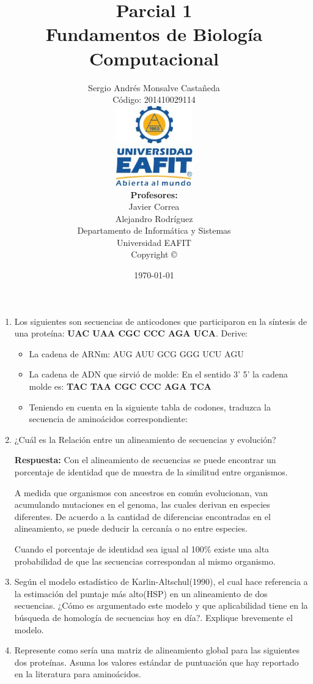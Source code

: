 \documentclass[twoside,letterpaper,12pt]{report}
\title{Parcial 1\\[1cm]
Fundamentos de Biología Computacional}
\author{
	Sergio Andrés Monsalve Castañeda \\
	Código: 201410029114\\[0.5cm]	
	\includegraphics[width=0.25\textwidth]{logo_eafit} \\[1cm]
	\textbf{Profesores:} \\
	Javier Correa \\
	Alejandro Rodríguez \\[1cm]
	Departamento de Informática y Sistemas \\
	Universidad EAFIT\\[0.5cm] 
	Copyright \copyright \hspace{3pt}
}
\date{\today}
\begin{document}
\maketitle

\begin{enumerate}
	\item  Los siguientes son secuencias de anticodones que participaron en la síntesis de una proteína: \textbf{ UAC UAA	CGC	CCC	AGA	UCA}. Derive:

\begin{itemize}
	\item La cadena de ARNm: AUG AUU GCG GGG UCU AGU
	\item La cadena de ADN que sirvió de molde: En el sentido 3' 5' la cadena molde es: \textbf{TAC TAA CGC CCC AGA TCA}
	\item Teniendo en cuenta en la siguiente tabla de codones, traduzca la secuencia de aminoácidos correspondiente: 
\end{itemize}

	\item ¿Cuál es la Relación entre un alineamiento de secuencias y evolución?

	\textbf{Respuesta:}  Con el alineamiento de secuencias se puede encontrar un porcentaje de identidad que de muestra de la similitud entre organismos. 

	A medida que organismos con ancestros en común evolucionan, van acumulando mutaciones en el genoma, las  cuales derivan en especies diferentes. De acuerdo a la cantidad de diferencias encontradas en el alineamiento, se puede deducir la cercanía o no entre especies. 
 
	Cuando el porcentaje de identidad sea igual al 100\% existe una alta probabilidad de que las secuencias correspondan al mismo organismo.

	\item Según el modelo estadístico de Karlin-Altschul(1990), el cual hace referencia a la estimación del puntaje más alto(HSP) en un alineamiento de dos secuencias. ¿Cómo es argumentado este modelo y que aplicabilidad tiene en la búsqueda de homología de secuencias hoy en día?. Explique brevemente el modelo.



	\item Represente como sería una matriz de alineamiento global para las siguientes dos proteínas. Asuma los valores estándar de puntuación que hay reportado en la literatura para aminoácidos.	


\end{enumerate}
\end{document}
